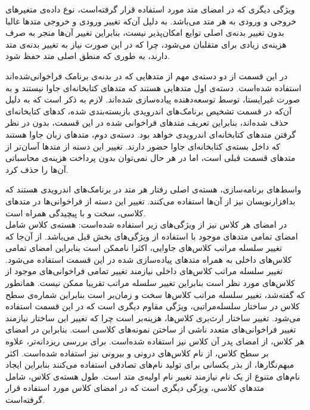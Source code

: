  ویژگی دیگری که در امضای متد مورد استفاده قرار گرفته‌است، نوع داده‌ی متغیر‌های خروجی و ورودی به هر متد می‌باشد. به دلیل آن‌که تغییر ورود‌ی و خروجی متد‌ها غالبا بدون تغییر بدنه‌ی اصلی توابع امکان‌پذیر نیست، ‌بنابراین تغییر آن‌ها منجر به صرف هزینه‌ی زیادی برای متقلبان می‌شود، چرا که در این صورت نیاز به تغییر بدنه‌ی متد دارند، به طوری که منطق اصلی متد حفظ شود.

 در این قسمت از دو دسته‌‌ی مهم از متد‌هایی که در بدنه‌ی برنامک فراخوانی‌شده‌اند استفاده شده‌است. دسته‌ی اول متد‌هایی هستند که متد‌های کتابخانه‌ای جاوا نیستند و به صورت غیرایستا،  توسط توسعه‌د‌هنده پیاده‌سازی شده‌اند. لازم به ذکر است که به دلیل آن‌که در قسمت تشخیص برنامک‌های اندرویدی بازبسته‌بندی شده، کد‌های کتابخانه‌ای حذف شده‌اند، بنابراین تعریف متد‌های فراخوانی شده در این قسمت، بدون در نظر گرفتن متد‌های کتابخانه‌ای اندرویدی خواهد بود. دسته‌ی دوم، متد‌های زبان جاوا هستند که داخل بسته‌ی کتابخانه‌ای جاوا حضور دارند. تغییر این دسته از متد‌ها آسان‌تر از متد‌های قسمت قبلی است، اما در هر حال نمی‌توان بدون پرداخت هزینه‌ی محاسباتی آن‌ها را حذف کرد.

 واسط‌های برنامه‌سازی، هسته‌ی اصلی رفتار هر متد در برنامک‌های اندرویدی هستند که بدافزارنویسان نیز از آن‌ها استفاده می‌کنند. تغییر این دسته از فراخوانی‌ها در متد‌های کلاسی، سخت و با پیچیدگی همراه است.\\
در امضای هر کلاس نیز از ویژگی‌های زیر استفاده شده‌است: 
 هسته‌ی کلاس شامل امضای تمامی متد‌های موجود با استفاده از ویژگی‌های بخش قبل می‌باشد.
 از آن‌جا که تغییر سلسله مراتب کلاس‌های جاوایی، اکثرا ناممکن است بنابراین امضای تمامی کلاس‌های داخلی به همراه متد‌های پیاده‌سازی شده در این قسمت استفاده می‌شود. تغییر سلسله مراتب کلاس‌های داخلی نیازمند تغییر تمامی فراخوانی‌های موجود از کلاس‌های مورد نظر است بنابراین تغییر سلسله مراتب تقریبا ممکن نیست.
 همانطور که گفته‌شد، تغییر سلسله مراتب کلاس‌ها سخت و زمان‌بر است بنابراین شماره‌ی سطح کلاس در ساختار سلسله‌مراتبی، ویژگی مقاوم دیگری است که در این قسمت استفاده می‌شود.
 تغییر ساختار ارث‌بری کلاس‌ها، هزینه‌بر است چرا که تغییر این ساختار نیازمند تغییر فراخوانی‌های متعدد ناشی از ساختن نمونه‌های کلاسی است. بنابراین در امضای هر کلاس، از امضای پدر آن کلاس نیز استفاده شده‌است.
 برای بررسی ریزدانه‌تر، علاوه بر سطح کلاس، از نام کلاس‌های درونی و بیرونی نیز استفاده شده‌است. اکثر مبهم‌نگار‌ها، از بذر‌ یکسانی برای تولید نام‌های تصادفی استفاده می‌کنند بنابراین ایجاد نام‌های متنوع از یک نام نیازمند تغییر نام اولیه‌ی متد است.
 طول هسته‌ی کلاس، شامل متد‌های کلاسی، ویژگی دیگری است که در امضای کلاس مورد استفاده قرار گرفته‌است. 

